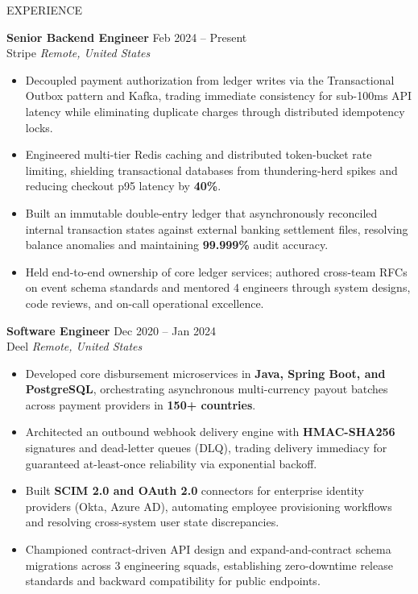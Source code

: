 \documentclass{resume} %
\begin{document}
\begin{rSection}{EXPERIENCE}

\textbf{Senior Backend Engineer} \hfill Feb 2024 -- Present\\
Stripe \hfill \textit{Remote, United States}
 \begin{itemize}
    \itemsep -5pt \topsep 0pt \parsep 0pt
     \item Decoupled payment authorization from ledger writes via the Transactional Outbox pattern and Kafka, trading immediate consistency for sub-100ms API latency while eliminating duplicate charges through distributed idempotency locks.
     \item Engineered multi-tier Redis caching and distributed token-bucket rate limiting, shielding transactional databases from thundering-herd spikes and reducing checkout p95 latency by \textbf{40\%}.
     \item Built an immutable double-entry ledger that asynchronously reconciled internal transaction states against external banking settlement files, resolving balance anomalies and maintaining \textbf{99.999\%} audit accuracy.
     \item Held end-to-end ownership of core ledger services; authored cross-team RFCs on event schema standards and mentored 4 engineers through system designs, code reviews, and on-call operational excellence.
 \end{itemize}
 
\textbf{Software Engineer} \hfill Dec 2020 -- Jan 2024\\
Deel \hfill \textit{Remote, United States}
 \begin{itemize}
    \itemsep -5pt \topsep 0pt \parsep 0pt
     \item Developed core disbursement microservices in \textbf{Java, Spring Boot, and PostgreSQL}, orchestrating asynchronous multi-currency payout batches across payment providers in \textbf{150+ countries}.
     \item Architected an outbound webhook delivery engine with \textbf{HMAC-SHA256} signatures and dead-letter queues (DLQ), trading delivery immediacy for guaranteed at-least-once reliability via exponential backoff.
     \item Built \textbf{SCIM 2.0 and OAuth 2.0} connectors for enterprise identity providers (Okta, Azure AD), automating employee provisioning workflows and resolving cross-system user state discrepancies.
     \item Championed contract-driven API design and expand-and-contract schema migrations across 3 engineering squads, establishing zero-downtime release standards and backward compatibility for public endpoints.
 \end{itemize}


\end{rSection}
\end{document}
